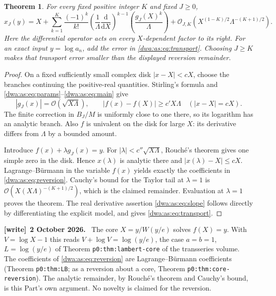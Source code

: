 \documentclass[11pt,letterpaper]{article}
\numberwithin{equation}{section}
\newtheorem{theorem}{Theorem}[section]
\theoremstyle{remark}
\newcommand{\dd}{\mathrm d}
\newcommand{\OO}{\mathcal O}
\newenvironment{writenote}[1][]{\par\smallskip\begingroup\small
 \noindent\textbf{[write]}\if\relax\detokenize{#1}\relax\else~\textbf{#1.}\fi\ }%
 {\par\endgroup\smallskip}
\begin{document}
\begin{theorem}\label{dwa:as:thm:inverse}
For every fixed positive integer $K$ and fixed $J\ge0$,
\begin{equation}\label{dwa:as:eq:reversion}
 x_J(y)=X+\sum_{k=1}^K\frac{(-1)^k}{k!}
 \left(\frac1{\Lambda}\frac{\dd}{\dd X}\right)^{k-1}
 \left(\frac{g_J(X)^k}{\Lambda}\right)
 +\OO_{J,K}\left(X^{(1-K)/2}\Lambda^{-(K+1)/2}\right).
\end{equation}
Here the differential operator acts on every $X$-dependent factor to its right. For an exact input $y=\log a_n$, add the error in \eqref{dwa:as:eq:transport}. Choosing $J\ge K$ makes that transport error smaller than the displayed reversion remainder.
\end{theorem}
\begin{proof}
On a fixed sufficiently small complex disk $|x-X|<cX$, choose the branches continuing the positive-real quantities. Stirling's formula and \eqref{dwa:as:eq:params}--\eqref{dwa:as:eq:main} give
\[
 |g_J(x)|=\OO(\sqrt{X\Lambda}),\qquad
 |f(x)-f(X)|\ge c'X\Lambda\quad (|x-X|=cX).
\]
The finite correction in $B_J/M$ is uniformly close to one there, so its logarithm has an analytic branch. Also $f$ is univalent on the disk for large $X$: its derivative differs from $\Lambda$ by a bounded amount.

Introduce $f(x)+\lambda g_J(x)=y$. For $|\lambda|<c''\sqrt{X\Lambda}$, Rouch\'e's theorem gives one simple zero in the disk. Hence $x(\lambda)$ is analytic there and $|x(\lambda)-X|\le cX$. Lagrange--B\"urmann in the variable $f(x)$ yields exactly the coefficients in \eqref{dwa:as:eq:reversion}. Cauchy's bound for the Taylor tail at $\lambda=1$ is
$\OO(X(X\Lambda)^{-(K+1)/2})$, which is the claimed remainder. Evaluation at $\lambda=1$ proves the theorem. The real derivative assertion \eqref{dwa:as:eq:slope} follows directly by differentiating the explicit model, and gives \eqref{dwa:as:eq:transport}.
\end{proof}
\begin{writenote}[2 October 2026]
The core $X=y/W(y/e)$ solves $f(X)=y$. With $V=\log X-1$ this reads $V+\log V=\log(y/e)$, the case $a=b=1$, $L=\log(y/e)$ of Theorem \texttt{p0:thm:lambert-core} of the transseries volume. The coefficients of \eqref{dwa:as:eq:reversion} are Lagrange--B\"urmann coefficients (Theorem \texttt{p0:thm:LB}; as a reversion about a core, Theorem \texttt{p0:thm:core-reversion}). The analytic remainder, by Rouch\'e's theorem and Cauchy's bound, is this Part's own argument. No novelty is claimed for the reversion.
\end{writenote}
\end{document}
